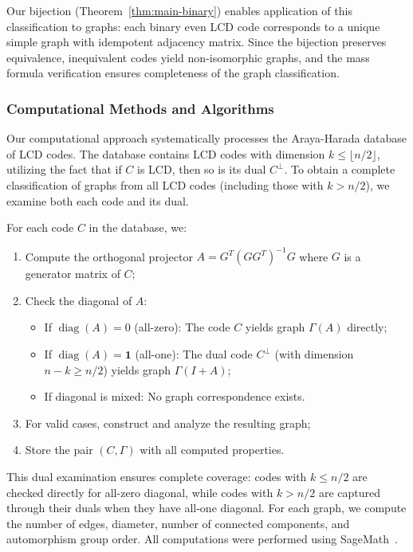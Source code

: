 \documentclass[a4paper,11pt]{article}
\theoremstyle{remark}
\DeclareMathOperator{\diag}{diag}
\begin{document}
Our bijection (Theorem~\ref{thm:main-binary}) enables application of this classification to graphs: each binary even LCD code corresponds to a unique simple graph with idempotent adjacency matrix. Since the bijection preserves equivalence, inequivalent codes yield non-isomorphic graphs, and the mass formula verification ensures completeness of the graph classification.

\subsubsection{Computational Methods and Algorithms}

Our computational approach systematically processes the Araya-Harada database \cite{araya2019} of LCD codes. The database contains LCD codes with dimension $k \leq \lfloor n/2 \rfloor$, utilizing the fact that if $C$ is LCD, then so is its dual $C^\perp$. To obtain a complete classification of graphs from all LCD codes (including those with $k > n/2$), we examine both each code and its dual.

For each code $C$ in the database, we:
\begin{enumerate}
\item Compute the orthogonal projector $A = G^T(GG^T)^{-1}G$ where $G$ is a generator matrix of $C$;
\item Check the diagonal of $A$:
   \begin{itemize}
   \item If $\diag(A) = 0$ (all-zero): The code $C$ yields graph $\Gamma(A)$ directly;
   \item If $\diag(A) = \mathbf{1}$ (all-one): The dual code $C^\perp$ (with dimension $n-k \geq n/2$) yields graph $\Gamma(I+A)$;
   \item If diagonal is mixed: No graph correspondence exists.
   \end{itemize}
\item For valid cases, construct and analyze the resulting graph;
\item Store the pair $(C, \Gamma)$ with all computed properties.
\end{enumerate}

This dual examination ensures complete coverage: codes with $k \leq n/2$ are checked directly for all-zero diagonal, while codes with $k > n/2$ are captured through their duals when they have all-one diagonal.
For each graph, we compute the number of edges, diameter, number of connected components, and automorphism group order. All computations were performed using SageMath~\cite{sagemath}.
\end{document}
